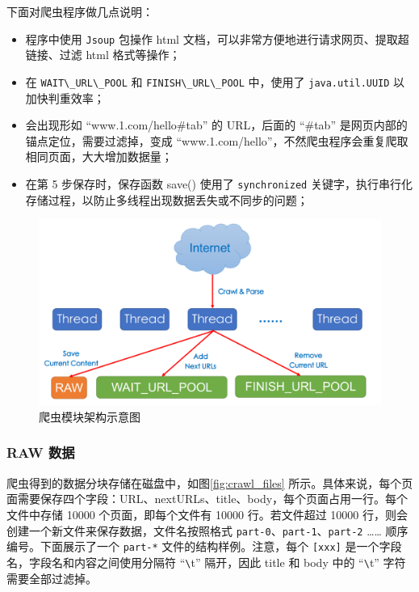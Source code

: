 \documentclass{ctexart}
\newcommand{\code}[1]{\colorbox{backcolor}{\lstinline|#1|}}
\begin{document}
    下面对爬虫程序做几点说明：

    \begin{itemize}
        \item 程序中使用 \code{Jsoup} 包操作 html 文档，可以非常方便地进行请求网页、提取超链接、过滤 html 格式等操作；
        \item 在 \code{WAIT\_URL\_POOL} 和 \code{FINISH\_URL\_POOL} 中，使用了 \code{java.util.UUID} 以加快判重效率；
        \item 会出现形如 “www.1.com/hello#tab” 的 URL，后面的 “#tab” 是网页内部的锚点定位，需要过滤掉，变成 “www.1.com/hello”，不然爬虫程序会重复爬取相同页面，大大增加数据量；
        \item 在第 5 步保存时，保存函数 save() 使用了 \code{synchronized} 关键字，执行串行化存储过程，以防止多线程出现数据丢失或不同步的问题；
    \end{itemize}

    \begin{figure}[t]
        \centering
        \includegraphics[width=\textwidth]{src/crawl}
        \caption{爬虫模块架构示意图}
        \label{fig:crawl}
    \end{figure}

    \subsubsection{RAW 数据}\label{subsubsec:crawl_data}

    爬虫得到的数据分块存储在磁盘中，如图\ref{fig:crawl_files} 所示。具体来说，每个页面需要保存四个字段：URL、nextURLs、title、body，每个页面占用一行。每个文件中存储 10000 个页面，即每个文件有 10000 行。若文件超过 10000 行，则会创建一个新文件来保存数据，文件名按照格式 \code{part-0}、\code{part-1}、\code{part-2} …… 顺序编号。下面展示了一个 \code{part-*} 文件的结构样例。注意，每个 \code{[xxx]} 是一个字段名，字段名和内容之间使用分隔符 “\verb|\|t” 隔开，因此 title 和 body 中的 “\verb|\|t” 字符需要全部过滤掉。
\end{document}
